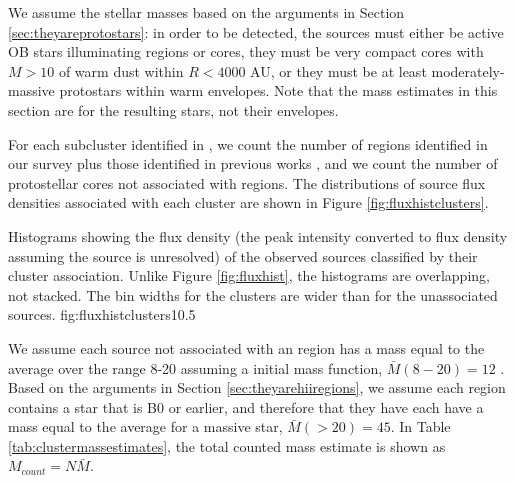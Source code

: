 \documentclass[twocolumn]{aastex61}
\begin{document}
We assume the
stellar masses based on the arguments in Section \ref{sec:theyareprotostars}:
in order to be detected, the sources must either be active OB stars
illuminating \hii regions or cores, they must be very compact cores with
$M>10$ \msun of warm dust within $R<4000$ AU, or they must be
at least moderately-massive protostars within warm envelopes.  Note that the
mass estimates in this section are for the resulting stars, not their
envelopes.




For each subcluster identified in \citet[][see Figure
\ref{fig:overview}]{Schmiedeke2016a}, we count the number of \hii regions
identified in our survey plus those identified in previous works
\citep{Gaume1995a,de-Pree1996a}, and we count the number of protostellar cores
not associated with \hii regions.  The distributions of source flux densities
associated with each cluster are shown in Figure \ref{fig:fluxhistclusters}.

{Histograms showing the flux density (the peak intensity converted to flux density
assuming the source is unresolved) of the observed sources classified by their
cluster association.  Unlike Figure \ref{fig:fluxhist}, the histograms are
overlapping, not stacked.  The bin widths for the clusters are wider than
for the unassociated sources.}
{fig:fluxhistclusters}{1}{0.5\textwidth}


We assume each source not associated with an \hii region has a mass equal to
the average over the range 8-20 \msun assuming a \citet{Kroupa2001a} initial
mass function, $\bar{M}(8-20) = 12$ \msun.  Based on the arguments in Section
\ref{sec:theyarehiiregions}, we assume each \hii region contains a star that is
B0 or earlier, and therefore that they have each have a mass equal to the
average for a massive star, $\bar{M}(>20) = 45$.  In Table
\ref{tab:clustermassestimates}, the total counted mass estimate is shown as
$M_{count} = N \bar{M}$.
\end{document}
